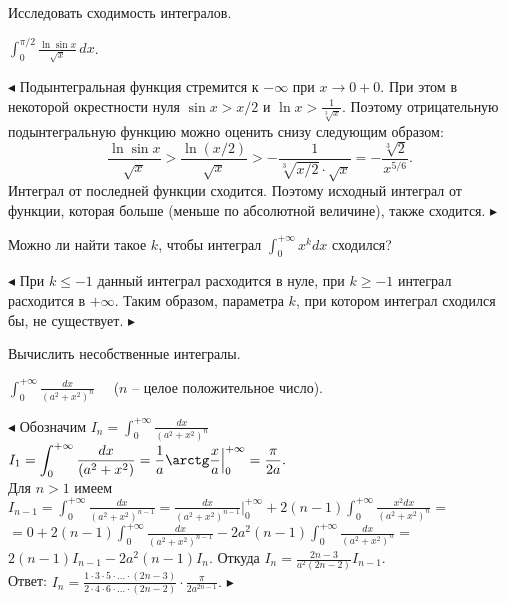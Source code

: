 \documentclass[a5paper,10pt]{article}
\begin{document}
\bigskip\noindent Исследовать сходимость интегралов.

\medskip
{} $\displaystyle \int_0^{\pi/2}\frac{\ln\sin x}{\sqrt x}\,dx$.

\smallskip
\noindent $\blacktriangleleft$ Подынтегральная функция стремится к $-\infty$ при $x\to0+0$.
При этом в некоторой окрестности нуля $\sin x>x/2$ и $\displaystyle \ln x>\frac{1}{\sqrt[3]x}$.
Поэтому отрицательную подынтегральную функцию можно оценить снизу следующим
образом: $$\displaystyle \frac{\ln\sin x}{\sqrt x}>\frac{\ln(x/2)}{\sqrt x}>-\frac{1}{\sqrt[3]{ x/2}\cdot\sqrt x}=-\frac{\sqrt[3]2}{x^{5/6}}.$$
Интеграл от последней функции сходится. Поэтому исходный интеграл от функции, которая больше  (меньше по абсолютной величине), также сходится. $\blacktriangleright$

\medskip
{} Можно ли найти такое $k$, чтобы интеграл
$\displaystyle \int_{0}^{+\infty}x^kdx$ сходился?

\smallskip
\noindent $\blacktriangleleft$ При $k\le-1$ данный интеграл расходится в нуле,
при $k\ge-1$ интеграл расходится в $+\infty$. Таким образом, параметра $k$, при
котором интеграл сходился бы, не существует. $\blacktriangleright$

\bigskip\noindent Вычислить несобственные интегралы.

\medskip
{} $\displaystyle \int_{0}^{+\infty}\frac{dx}{(a^2+x^2)^n}\quad$ ($n$ -- целое
положительное число).

\smallskip
\noindent $\blacktriangleleft$ Обозначим
$\displaystyle I_n=\int_{0}^{+\infty}\frac{dx}{(a^2+x^2)^n}$\\
$\displaystyle I_1=\int_{0}^{+\infty}\frac{dx}{(a^2+x^2)}=
\frac 1a\arctg\frac xa\Big|_{0}^{+\infty}=\frac{\pi}{2a}.$\\
Для $n>1$ имеем\\
$\displaystyle I_{n-1}=\int_{0}^{+\infty}\frac{dx}{(a^2+x^2)^{n-1}}=
\frac{dx}{(a^2+x^2)^{n-1}}\Big|_{0}^{+\infty}
+2(n-1)\int_{0}^{+\infty}\frac{x^2dx}{(a^2+x^2)^{n}}=$\\
$\displaystyle =0+2(n-1)\int_{0}^{+\infty}\frac{dx}{(a^2+x^2)^{n-1}}
-2a^2(n-1)\int_{0}^{+\infty}\frac{dx}{(a^2+x^2)^{n}}=$\\
$2(n-1)I_{n-1}-2a^2(n-1)I_n.$ Откуда $\displaystyle I_n=\frac{2n-3}{a^2(2n-2)}I_{n-1}.$\\
Ответ: $\displaystyle I_n=\frac{1\cdot3\cdot5\cdot\ldots\cdot(2n-3)}
{2\cdot4\cdot6\cdot\ldots\cdot(2n-2)}\cdot\frac{\pi}{2a^{2n-1}}.$ $\blacktriangleright$
\end{document}
